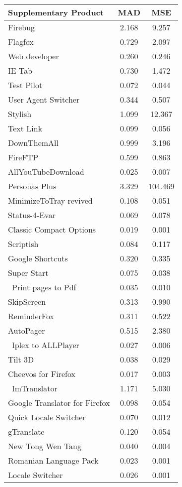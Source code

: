 \documentclass[mksc,nonblindrev]{informs3}
\begin{document}
\begin{table}
	\centering
		\begin{tabular}{lcc}\hline \hline
		Supplementary Product	&	MAD	&	MSE	\\ \hline
		Firebug	&	2.168	&	9.257	\\
		Flagfox	&	0.729	&	2.097	\\
		Web developer	&	0.260	&	0.246	\\
		IE Tab	&	0.730	&	1.472	\\
		Test Pilot	&	0.072	&	0.044	\\
		User Agent Switcher	&	0.344	&	0.507	\\
		Stylish	&	1.099	&	12.367	\\
		Text Link	&	0.099	&	0.056	\\
		DownThemAll	&	0.999	&	3.196	\\
		FireFTP	&	0.599	&	0.863	\\
		AllYouTubeDownload	&	0.025	&	0.007	\\
		Personas Plus	&	3.329	&	104.469	\\
		MinimizeToTray revived	&	0.108	&	0.051	\\
		Status-4-Evar	&	0.069	&	0.078	\\
		Classic Compact Options	&	0.019	&	0.001	\\
		Scriptish	&	0.084	&	0.117	\\
		Google Shortcuts	&	0.320	&	0.335	\\
		Super Start	&	0.075	&	0.038	\\
		 Print pages to Pdf	&	0.035	&	0.010	\\
		SkipScreen	&	0.313	&	0.990	\\
		ReminderFox	&	0.311	&	0.522	\\
		AutoPager	&	0.515	&	2.380	\\
		 Iplex to ALLPlayer	&	0.027	&	0.006	\\
		Tilt 3D	&	0.038	&	0.029	\\
		Cheevos for Firefox	&	0.017	&	0.003	\\
		 ImTranslator 	&	1.171	&	5.030	\\
		Google Translator for Firefox	&	0.098	&	0.054	\\
		Quick Locale Switcher	&	0.070	&	0.012	\\
		gTranslate	&	0.120	&	0.054	\\
		New Tong Wen Tang	&	0.040	&	0.004	\\
		 Romanian Language Pack	&	0.023	&	0.001	\\
		Locale Switcher	&	0.026	&	0.001	\\

\end{tabular}
\end{table}
\end{document}
